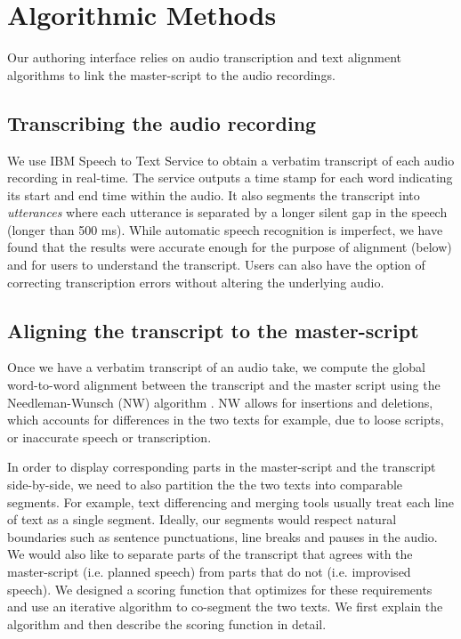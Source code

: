 \section{Algorithmic Methods}
\label{sec:algorithms}
Our authoring interface relies on audio transcription and text alignment algorithms to link the master-script to the audio recordings.  

\subsection{Transcribing the audio recording}
We use IBM Speech to Text Service \cite{ibmspeechtotext} to obtain a verbatim transcript of each audio recording in real-time. The service outputs a time stamp for each word indicating its start and end time within the audio. It also segments the transcript into \textit{utterances} where each utterance is separated by a longer silent gap in the speech (longer than 500 ms). While automatic speech recognition is imperfect, we have found that the results were accurate enough for the purpose of alignment (below) and for users to understand the transcript. Users can also have the option of correcting transcription errors without altering the underlying audio.
  
\subsection{Aligning the transcript to the master-script}
Once we have a verbatim transcript of an audio take, we compute the global word-to-word alignment between the transcript and the master script using the Needleman-Wunsch (NW) algorithm \cite{needleman1970general}. NW allows for insertions and deletions, which accounts for differences in the two texts for example, due to loose scripts, or inaccurate speech or transcription.

In order to display corresponding parts in the master-script and the transcript side-by-side, we need to also partition the the two texts into comparable segments. For example, text differencing and merging tools usually treat each line of text as a single segment.
Ideally, our segments would respect natural boundaries such as sentence punctuations, line breaks and pauses in the audio. We would also like to separate parts of the transcript that agrees with the master-script (i.e. planned speech) from parts that do not (i.e. improvised speech).  
We designed a scoring function that optimizes for these requirements and use an iterative algorithm to co-segment the two texts. We first explain the algorithm and then describe the scoring function in detail.

